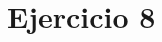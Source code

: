 \documentclass[../../e3_tp2_main.tex]{subfiles}
\begin{document}
\chapter{Ejercicio 8}
\end{document}
